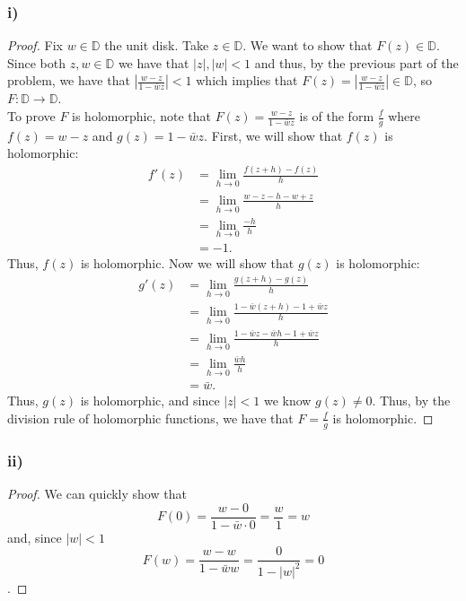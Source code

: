 \documentclass{article}
\begin{document}
\subsubsection*{i)}
\begin{proof}
    Fix $w \in \mathbb{D}$ the unit disk. Take $z \in \mathbb{D}$. We want to show that $F(z) \in \mathbb{D}$. 
    Since both $z, w \in \mathbb{D}$ we have that $|z|, |w| < 1$ and thus, by the previous part of the problem, we have that $\left|\frac{w - z}{1 -\bar{w}z} \right| < 1$ which implies that $F(z) =\left|\frac{w - z}{1 -\bar{w}z} \right| \in \mathbb{D}$, so $F: \mathbb{D} \to \mathbb{D}$. \\
    To prove $F$ is holomorphic, note that $F(z) = \frac{w - z}{1 - \bar{w}z}$ is of the form $\frac{f}{g}$ where $f(z) = w - z$ and $g(z ) = 1 - \bar{w}z$. First, we will show that $f(z)$ is holomorphic:
    \begin{align*}
        f'(z)&= \lim\limits_{h \to 0} \frac{f(z + h) - f(z)}{h} \\
        & = \lim\limits_{h \to 0} \frac{w - z - h - w + z}{h} \\
        &= \lim\limits_{h \to 0} \frac{- h}{h} \\
        &= -1. 
    \end{align*}
    Thus, $f(z)$ is holomorphic. Now we will show that $g(z)$ is holomorphic:
    \begin{align*}
        g'(z) &= \lim\limits_{h \to 0} \frac{g(z + h) - g(z)}{h} \\
        &= \lim\limits_{h \to 0} \frac{1 - \bar{w}(z + h) - 1 + \bar{w}z}{h} \\
        &= \lim\limits_{h \to 0} \frac{1 - \bar{w}z - \bar{w}h - 1 + \bar{w}z}{h} \\
        & = \lim\limits_{h \to 0} \frac{\bar{w}h}{h} \\
        & = \bar{w}. 
    \end{align*}
    Thus, $g(z)$ is holomorphic, and since $|z| < 1$ we know $g(z) \neq 0$. Thus, by the division rule of holomorphic functions, we have that $F = \frac{f}{g}$ is holomorphic. 
\end{proof}

\subsubsection*{ii)}
\begin{proof}
    We can quickly show that \[F(0) = \frac{w - 0}{1 - \bar{w} \cdot 0} = \frac{w}{1} = w \] 
    and, since $|w| < 1$ \[
        F(w) = \frac{w - w}{1 - \bar{w}w} = \frac{0}{1 - |w|^2} = 0 \].
\end{proof}
\end{document}
